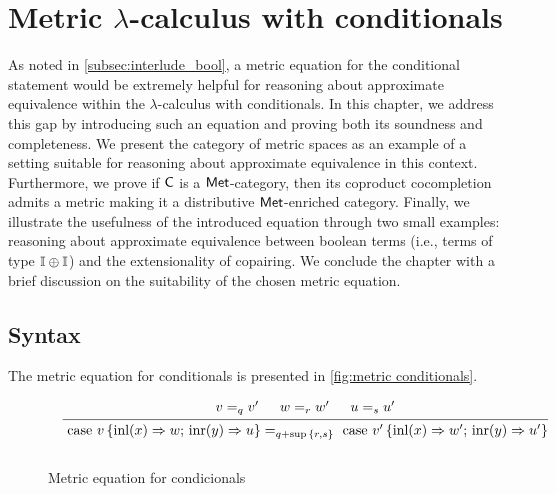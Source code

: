 \chapter{Metric $\lambda$-calculus with conditionals} \label{ch:conditionals}

As noted in \autoref{subsec:interlude_bool}, a metric equation for the conditional statement would be extremely helpful for reasoning about approximate equivalence within the $\lambda$-calculus with conditionals. In this chapter, we address this gap by introducing such an equation and proving both its soundness and completeness. 
We present the category of metric spaces as an example of a setting suitable for reasoning about approximate equivalence in this context. Furthermore, we prove if $\mathsf{C}$ is a $\mathsf{Met}$-category, then its coproduct cocompletion admits a metric making it a distributive $\mathsf{Met}$-enriched category.
Finally, we illustrate the usefulness of the introduced equation through two small examples: reasoning about approximate equivalence between boolean terms (i.e., terms of type $\mathbb{I} \oplus \mathbb{I}$) and the extensionality of copairing. We conclude the chapter with a brief discussion on the suitability of the chosen metric equation.






\section{Syntax}

The metric equation for conditionals is presented in \autoref{fig:metric conditionals}. 

\begin{figure}[H]
  \begin{equation*}
  \begin{aligned}
  &
  &
  \begin{prooftree}
      \hypo{ v =_{q} v' }
      \hypo{w=_{r} w'}
      \hypo{u=_{s}u'}
      \infer3[]{\text{ case } v \,   \{\text{inl} (x) \Rightarrow w ; \, \text{inr} (y) \Rightarrow u\} =_{q+\sup{\{ r, s \}}} \text{ case } v' \,  \{\text{inl} (x) \Rightarrow w' ; \,\text{inr} (y) \Rightarrow u'\} }
  \end{prooftree}
  \\[10pt]
  \end{aligned}
  \end{equation*}
  \caption{Metric equation for condicionals}
  \label{fig:metric conditionals}
\end{figure}


